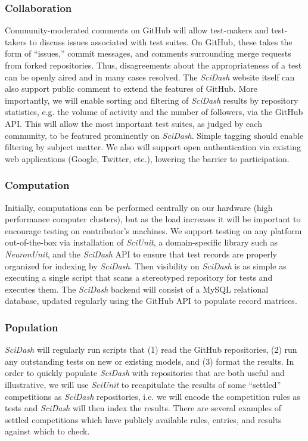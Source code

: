 \documentclass[11pt,letterpaper]{article}
\begin{document}
\subsubsection{Collaboration}
Community-moderated comments on GitHub will allow test-makers and test-takers to discuss issues associated with test suites.  On GitHub, these takes the form of ``issues,'' commit messages, and comments surrounding merge requests from forked repositories.  Thus, disagreements about the appropriateness of a test can be openly aired and in many cases resolved.  The \textit{SciDash} website itself can also support public comment to extend the features of GitHub.  More importantly, we will enable sorting and filtering of \textit{SciDash} results by repository statistics, e.g. the volume of activity and the number of followers, via the GitHub API.  This will allow the most important test suites, as judged by each community, to be featured prominently on \textit{SciDash}.  Simple tagging should enable filtering by subject matter.  We also will support open authentication via existing web applications (Google, Twitter, etc.), lowering the barrier to participation.  

\subsubsection{Computation}
Initially, computations can be performed centrally on our hardware (high performance computer clusters), but as the load increases it will be important to encourage testing on contributor's machines.  We support testing on any platform out-of-the-box via installation of \textit{SciUnit}, a domain-specific library such as \textit{NeuronUnit}, and the \textit{SciDash} API to ensure that test records are properly organized for indexing by \textit{SciDash}.  Then visibility on \textit{SciDash} is as simple as executing a single script that scans a stereotyped repository for tests and executes them.  The \textit{SciDash} backend will consist of a MySQL relational database, updated regularly using the GitHub API to populate record matrices.  

\subsubsection{Population}
\textit{SciDash} will regularly run scripts that (1) read the GitHub repositories, (2) run any outstanding tests on new or existing models, and (3) format the results.  In order to quickly populate \textit{SciDash} with repositories that are both useful and illustrative, we will use \textit{SciUnit} to recapitulate the results of some ``settled'' competitions as \textit{SciDash} repositories, i.e. we will encode the competition rules as tests and \textit{SciDash} will then index the results.  There are several examples of settled competitions which have publicly available rules, entries, and results against which to check\cite{jolivet_quantitative_2008,hopfield_what_2000,neural_prediction_url}.  
\end{document}
